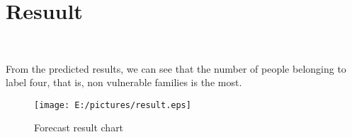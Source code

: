 \ 


\


\







\section{Resuult}
\

From the predicted results, we can see that the number of people belonging to label four, that is, non vulnerable families is the most.
\begin{figure}[htbp]
	\centering
	
	\texttt{[image: E:/pictures/result.eps]}
	\caption{Forecast result chart}\label{fig:result.eps}
\end{figure}

	

	
